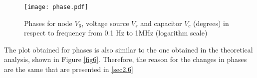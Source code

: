 \begin{figure}[!htp] \centering
\texttt{[image: phase.pdf]}
\captionsetup{justification=centering, margin=2cm}
\caption{Phases for node $V_6$, voltage source $V_s$ and capacitor $V_c$ (degrees) in respect to frequency from 0.1 Hz to 1MHz (logarithm scale)}
\label{phase}
\end{figure}
\FloatBarrier

The plot obtained for phases is also similar to the one obtained in the theoretical analysis, shown in Figure \ref{fig6}. Therefore, the reason for the changes in phases are the same that are presented in \ref{sec2.6}
